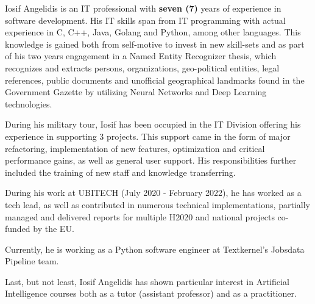 \par{
Iosif Angelidis is an IT professional with \textbf{seven (7)} years of experience in software development. His IT skills span from IT programming with actual experience in C, C++, Java, Golang and Python, among other languages. This knowledge is gained both from self-motive to invest in new skill-sets and as part of his two years engagement in a Named Entity Recognizer thesis, which recognizes and extracts persons, organizations, geo-political entities, legal references, public documents and unofficial geographical landmarks found in the Government Gazette by utilizing Neural Networks and Deep Learning technologies.}

\par{During his military tour, Iosif has been occupied in the IT Division offering his experience in supporting 3 projects. This support came in the form of major refactoring, implementation of new features, optimization and critical performance gains, as well as general user support. His responsibilities further included the training of new staff and knowledge transferring.}

\par{During his work at UBITECH (July 2020 - February 2022), he has worked as a tech lead, as well as contributed in numerous technical implementations, partially managed and delivered reports for multiple H2020 and national projects co-funded by the EU.}

\par{Currently, he is working as a Python software engineer at Textkernel's Jobsdata Pipeline team.}

\par{Last, but not least, Iosif Angelidis has shown particular interest in Artificial Intelligence courses both as a tutor (assistant professor) and as a practitioner.}
